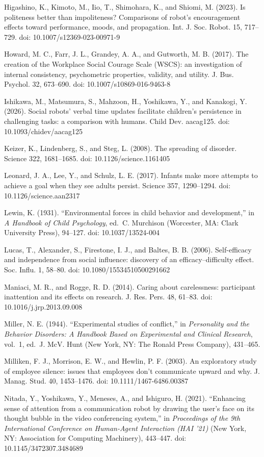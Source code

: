 \documentclass[
]{article}
\begin{document}
Higashino, K., Kimoto, M., Iio, T., Shimohara, K., and Shiomi, M.
(2023). Is politeness better than impoliteness? Comparisons of robot's
encouragement effects toward performance, moods, and propagation. Int.
J. Soc. Robot. 15, 717--729. doi: 10.1007/s12369-023-00971-9

Howard, M. C., Farr, J. L., Grandey, A. A., and Gutworth, M. B. (2017).
The creation of the Workplace Social Courage Scale (WSCS): an
investigation of internal consistency, psychometric properties,
validity, and utility. J. Bus. Psychol. 32, 673--690. doi:
10.1007/s10869-016-9463-8

Ishikawa, M., Matsumura, S., Mahzoon, H., Yoshikawa, Y., and Kanakogi,
Y. (2026). Social robots' verbal time updates facilitate children's
persistence in challenging tasks: a comparison with humans. Child Dev.
aacag125. doi: 10.1093/chidev/aacag125

Keizer, K., Lindenberg, S., and Steg, L. (2008). The spreading of
disorder. Science 322, 1681--1685. doi: 10.1126/science.1161405

Leonard, J. A., Lee, Y., and Schulz, L. E. (2017). Infants make more
attempts to achieve a goal when they see adults persist. Science 357,
1290--1294. doi: 10.1126/science.aan2317

Lewin, K. (1931). ``Environmental forces in child behavior and
development,'' in \emph{A Handbook of Child Psychology}, ed.~C.
Murchison (Worcester, MA: Clark University Press), 94--127. doi:
10.1037/13524-004

Lucas, T., Alexander, S., Firestone, I. J., and Baltes, B. B. (2006).
Self-efficacy and independence from social influence: discovery of an
efficacy--difficulty effect. Soc. Influ. 1, 58--80. doi:
10.1080/15534510500291662

Maniaci, M. R., and Rogge, R. D. (2014). Caring about carelessness:
participant inattention and its effects on research. J. Res. Pers. 48,
61--83. doi: 10.1016/j.jrp.2013.09.008

Miller, N. E. (1944). ``Experimental studies of conflict,'' in
\emph{Personality and the Behavior Disorders: A Handbook Based on
Experimental and Clinical Research}, vol.~1, ed.~J. McV. Hunt (New York,
NY: The Ronald Press Company), 431--465.

Milliken, F. J., Morrison, E. W., and Hewlin, P. F. (2003). An
exploratory study of employee silence: issues that employees don't
communicate upward and why. J. Manag. Stud. 40, 1453--1476. doi:
10.1111/1467-6486.00387

Nitada, Y., Yoshikawa, Y., Meneses, A., and Ishiguro, H. (2021).
``Enhancing sense of attention from a communication robot by drawing the
user's face on its thought bubble in the video conferencing system,'' in
\emph{Proceedings of the 9th International Conference on Human-Agent
Interaction (HAI '21)} (New York, NY: Association for Computing
Machinery), 443--447. doi: 10.1145/3472307.3484689
\end{document}

